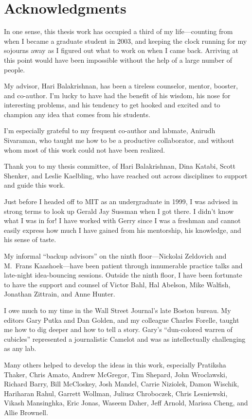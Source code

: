 \chapter*{Acknowledgments}
%

In one sense, this thesis work has occupied a third of my
life---counting from when I became a graduate student in 2003, and
keeping the clock running for my sojourns away as I figured out what
to work on when I came back. Arriving at this point would have been
impossible without the help of a large number of people.

My advisor, Hari Balakrishnan, has been a tireless counselor, mentor,
booster, and co-author. I'm lucky to have had the benefit of his
wisdom, his nose for interesting problems, and his tendency to get
hooked and excited and to champion any idea that comes from his students.

I'm especially grateful to my frequent co-author and labmate, Anirudh
Sivaraman, who taught me how to be a productive collaborator, and
without whom most of this work could not have been realized.

Thank you to my thesis committee, of Hari Balakrishnan, Dina Katabi,
Scott Shenker, and Leslie Kaelbling, who have reached out across
disciplines to support and guide this work.

Just before I headed off to MIT as an undergraduate in 1999, I was
advised in strong terms to look up Gerald Jay Sussman when I got
there. I didn't know what I was in for! I have worked with Gerry since
I was a freshman and cannot easily express how much I have gained from
his mentorship, his knowledge, and his sense of taste.

My informal ``backup advisors'' on the ninth floor---Nickolai
Zeldovich and M.~Frans Kaashoek---have been patient through
innumerable practice talks and late-night idea-bouncing
sessions. Outside the ninth floor, I have been fortunate to have the
support and counsel of Victor Bahl, Hal Abelson, Mike Walfish,
Jonathan Zittrain, and Anne Hunter.

I owe much to my time in the Wall Street Journal's late Boston
bureau. My editors Gary Putka and Dan Golden, and my colleague Charles
Forelle, taught me how to dig deeper and how to
tell a story. Gary's ``dun-colored warren of cubicles'' represented a
journalistic Camelot and was as intellectually challenging as any lab.

Many others helped to develop the ideas in this work, especially
Pratiksha Thaker, Chris Amato, Andrew McGregor, Tim Shepard, John
Wroclawski, Richard Barry, Bill McCloskey, Josh Mandel, Carrie Niziolek, Damon
Wischik, Hariharan Rahul, Garrett Wollman, Juliusz Chroboczek, Chris
Lesniewski, Vikash Mansinghka, Eric Jonas, Waseem Daher, Jeff Arnold, Marissa Cheng, and Allie
Brownell.

